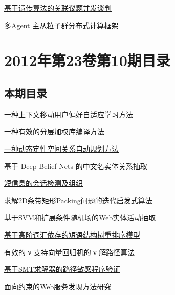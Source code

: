 \documentclass[a4paper]{article}
\begin{document}
\href{http://www.jos.org.cn/ch/reader/download_pdf.aspx?file_no=4299&year_id=2012&quarter_id=11&falg=1}{基于遗传算法的关联议题并发谈判}

\href{http://www.jos.org.cn/ch/reader/download_pdf.aspx?file_no=4305&year_id=2012&quarter_id=11&falg=1}{多Agent 主从粒子群分布式计算框架}


\section{\textbf{2012年第23卷第10期目录}}
\subsection{本期目录}
\href{http://www.jos.org.cn/ch/reader/download_pdf.aspx?file_no=4228&year_id=2012&quarter_id=10&falg=1}{一种上下文移动用户偏好自适应学习方法}

\href{http://www.jos.org.cn/ch/reader/download_pdf.aspx?file_no=4194&year_id=2012&quarter_id=10&falg=1}{一种有效的分层加权库编译方法}

\href{http://www.jos.org.cn/ch/reader/download_pdf.aspx?file_no=4182&year_id=2012&quarter_id=10&falg=1}{一种动态定性空间关系自动规划方法}

\href{http://www.jos.org.cn/ch/reader/download_pdf.aspx?file_no=4181&year_id=2012&quarter_id=10&falg=1}{基于 Deep Belief Nets 的中文名实体关系抽取}

\href{http://www.jos.org.cn/ch/reader/download_pdf.aspx?file_no=4191&year_id=2012&quarter_id=10&falg=1}{短信息的会话检测及组织}

\href{http://www.jos.org.cn/ch/reader/download_pdf.aspx?file_no=4187&year_id=2012&quarter_id=10&falg=1}{求解2D条带矩形Packing问题的迭代启发式算法}

\href{http://www.jos.org.cn/ch/reader/download_pdf.aspx?file_no=4189&year_id=2012&quarter_id=10&falg=1}{基于SVM和扩展条件随机场的Web实体活动抽取}

\href{http://www.jos.org.cn/ch/reader/download_pdf.aspx?file_no=4192&year_id=2012&quarter_id=10&falg=1}{基于高阶词汇依存的短语结构树重排序模型}

\href{http://www.jos.org.cn/ch/reader/download_pdf.aspx?file_no=4153&year_id=2012&quarter_id=10&falg=1}{有效的 ν 支持向量回归机的 ν 解路径算法}

\href{http://www.jos.org.cn/ch/reader/download_pdf.aspx?file_no=4196&year_id=2012&quarter_id=10&falg=1}{基于SMT求解器的路径敏感程序验证}

\href{http://www.jos.org.cn/ch/reader/download_pdf.aspx?file_no=4185&year_id=2012&quarter_id=10&falg=1}{面向约束的Web服务发现方法研究}
\end{document}
